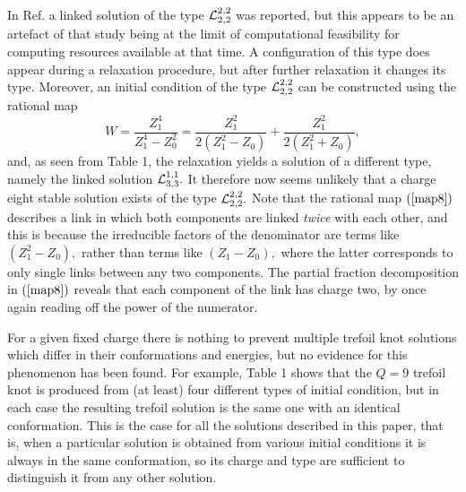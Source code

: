 \documentclass[12pt]{article}
\newcommand{\be}{\begin{equation}}
\newcommand{\ee}{\end{equation}}
\begin{document}
In Ref.\cite{BS5} a linked solution of the type ${\cal
L}_{2,2}^{2,2}$ was reported, but this appears to be an artefact of
that study being at the limit of computational feasibility for
computing resources available at that time. A configuration of this
type does appear during a relaxation procedure, but after further
relaxation it changes its type. Moreover, an initial condition
of the type ${\cal L}_{2,2}^{2,2}$ can be constructed using the
rational map \be
W=\frac{Z_1^4}{Z_1^4-Z_0^2}=\frac{Z_1^2}{2(Z_1^2-Z_0)}
+\frac{Z_1^2}{2(Z_1^2+Z_0)},\label{map8}\ee and, as seen from Table
1, the relaxation yields a solution of a different type, namely the
linked solution ${\cal L}_{3,3}^{1,1}.$ It therefore now seems
unlikely that a charge eight stable solution exists of the type
${\cal L}_{2,2}^{2,2}.$ Note that the rational map $(\ref{map8})$
describes a link in which both components are linked {\em twice}
with each other, and this is because the irreducible factors of the
denominator are terms like $(Z_1^2-Z_0),$ rather than terms like
$(Z_1-Z_0),$ where the latter corresponds to only single links
between any two components. The partial fraction decomposition in
$(\ref{map8})$ reveals that each component of the link has charge
two, by once again reading off the power of the numerator.

For a given fixed charge there is nothing to prevent multiple
trefoil knot solutions which differ in their conformations and
energies, but no evidence for this phenomenon has been found. For
example, Table 1 shows that the $Q=9$ trefoil knot is produced from
(at least) four different types of initial condition, but in each
case the resulting trefoil solution is the same one with an
identical conformation. This is the case for all the solutions
described in this paper, that is, when a particular solution is
obtained from various initial conditions it is always in the same
conformation, so its charge and type are sufficient to distinguish
it from any other solution.
\end{document}

